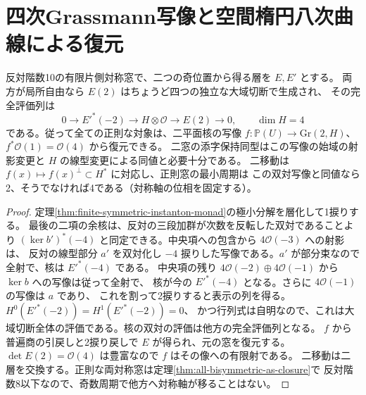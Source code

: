 \section{四次Grassmann写像と空間楕円八次曲線による復元}
\label{sec:finite-quartic-grassmann-windows}
\begin{theorem}\label{thm:finite-quartic-grassmann-windows}
反対階数10の有限片側対称窓で、二つの奇位置から得る層を $E,E'$ とする。
両方が局所自由なら $E(2)$ はちょうど四つの独立な大域切断で生成され、
その完全評価列は
\[
 0\to E'^*(-2)\to H\otimes\mathcal O\to E(2)\to0,\qquad \dim H=4
\]
である。従って全ての正則な対象は、二平面核の写像
$f:\mathbb P(U)\to\mathrm{Gr}(2,H)$、$f^*\mathcal O(1)=\mathcal O(4)$ から復元できる。
二窓の添字保持同型はこの写像の始域の射影変更と $H$ の線型変更による同値と必要十分である。
二移動は $f(x)\mapsto f(x)^\perp\subset H^*$ に対応し、正則窓の最小周期は
この双対写像と同値なら2、そうでなければ4である（対称軸の位相を固定する）。
\end{theorem}
\begin{proof}
定理\ref{thm:finite-symmetric-instanton-monad}の極小分解を層化して1捩りする。
最後の二項の余核は、反対の三段加群が次数を反転した双対であることより
$(\ker b')^*(-4)$ と同定できる。中央項への包含から $4\mathcal O(-3)$ への射影は、
反対の線型部分 $a'$ を双対化し $-4$ 捩りした写像である。$a'$ が部分束なので全射で、核は $E'^*(-4)$ である。
中央項の残り $4\mathcal O(-2)\oplus4\mathcal O(-1)$ から $\ker b$ への写像は従って全射で、
核が今の $E'^*(-4)$ となる。さらに $4\mathcal O(-1)$ の写像は $a$ であり、
これを割って2捩りすると表示の列を得る。$H^0(E'^*(-2))=H^1(E'^*(-2))=0$、
かつ行列式は自明なので、これは大域切断全体の評価である。核の双対の評価は他方の完全評価列となる。
$f$ から普遍商の引戻しと2捩り戻しで $E$ が得られ、元の窓を復元する。
$\det E(2)=\mathcal O(4)$ は豊富なので $f$ はその像への有限射である。
二移動は二層を交換する。正則な両対称窓は定理\ref{thm:all-bisymmetric-as-closure}で
反対階数8以下なので、奇数周期で他方へ対称軸が移ることはない。
\end{proof}

